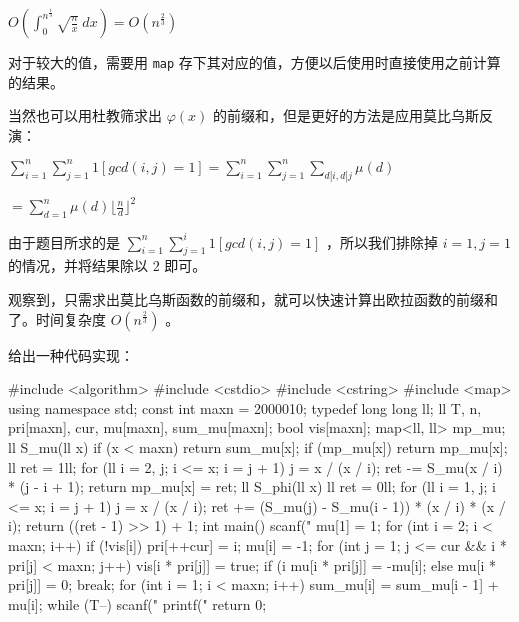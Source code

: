$O(\int_{0}^{n^{\frac 1 3}} \sqrt{\frac{n}{x}} ~ dx)=O(n^{\frac 2 3})$ 

对于较大的值，需要用 \texttt{map} 存下其对应的值，方便以后使用时直接使用之前计算的结果。

当然也可以用杜教筛求出 $\varphi (x)$ 的前缀和，但是更好的方法是应用莫比乌斯反演：

$\sum_{i=1}^n \sum_{j=1}^n 1[gcd(i,j)=1]=\sum_{i=1}^n \sum_{j=1}^n \sum_{d|i,d|j} \mu(d)$

$=\sum_{d=1}^n \mu(d) {\lfloor \frac n d \rfloor}^2$

由于题目所求的是 $\sum_{i=1}^n \sum_{j=1}^i 1[gcd(i,j)=1]$ ，所以我们排除掉 $i=1,j=1$ 的情况，并将结果除以 $2$ 即可。 

观察到，只需求出莫比乌斯函数的前缀和，就可以快速计算出欧拉函数的前缀和了。时间复杂度 $O(n^{\frac 2 3})$ 。 

给出一种代码实现：

\begin{cppcode}
#include <algorithm>
#include <cstdio>
#include <cstring>
#include <map>
using namespace std;
const int maxn = 2000010;
typedef long long ll;
ll T, n, pri[maxn], cur, mu[maxn], sum_mu[maxn];
bool vis[maxn];
map<ll, ll> mp_mu;
ll S_mu(ll x) {
  if (x < maxn) return sum_mu[x];
  if (mp_mu[x]) return mp_mu[x];
  ll ret = 1ll;
  for (ll i = 2, j; i <= x; i = j + 1) {
    j = x / (x / i);
    ret -= S_mu(x / i) * (j - i + 1);
  }
  return mp_mu[x] = ret;
}
ll S_phi(ll x) {
  ll ret = 0ll;
  for (ll i = 1, j; i <= x; i = j + 1) {
    j = x / (x / i);
    ret += (S_mu(j) - S_mu(i - 1)) * (x / i) * (x / i);
  }
  return ((ret - 1) >> 1) + 1;
}
int main() {
  scanf("%
  mu[1] = 1;
  for (int i = 2; i < maxn; i++) {
    if (!vis[i]) {
      pri[++cur] = i;
      mu[i] = -1;
    }
    for (int j = 1; j <= cur && i * pri[j] < maxn; j++) {
      vis[i * pri[j]] = true;
      if (i %
        mu[i * pri[j]] = -mu[i];
      else {
        mu[i * pri[j]] = 0;
        break;
      }
    }
  }
  for (int i = 1; i < maxn; i++) sum_mu[i] = sum_mu[i - 1] + mu[i];
  while (T--) {
    scanf("%
    printf("%
  }
  return 0;
}
\end{cppcode}
